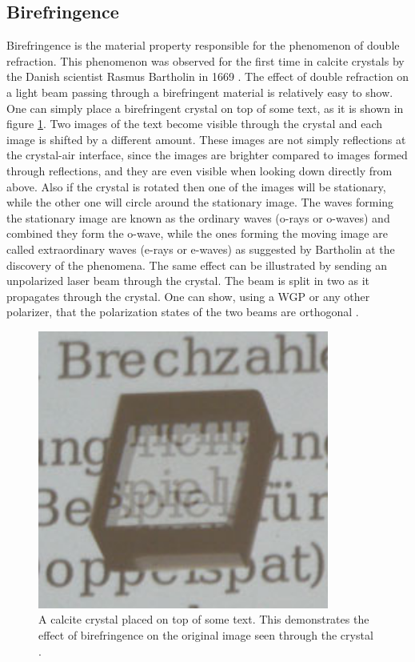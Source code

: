 \subsection{Birefringence}
\label{sec:birefringence}
Birefringence is the material property responsible for the phenomenon of double refraction. This phenomenon was observed for the first time in calcite crystals by the Danish scientist Rasmus Bartholin in 1669 \cite{RasmusBartholin1669, Restaino2015}. The effect of double refraction on a light beam passing through a birefringent material is relatively easy to show. One can simply place a birefringent crystal on top of some text, as it is shown in figure \ref{fig:3birefringence}. Two images of the text become visible through the crystal and each image is shifted by a different amount. These images are not simply reflections at the crystal-air interface, since the images are brighter compared to images formed through reflections, and they are even visible when looking down directly from above. Also if the crystal is rotated then one of the images will be stationary, while the other one will circle around the stationary image. The waves forming the stationary image are known as the ordinary waves (o-rays or o-waves) and combined they form the o-wave, while the ones forming the moving image are called extraordinary waves (e-rays or e-waves) as suggested by Bartholin at the discovery of the phenomena. The same effect can be illustrated by sending an unpolarized laser beam through the crystal. The beam is split in two as it propagates through the crystal. One can show, using a WGP or any other polarizer, that the polarization states of the two beams are orthogonal \cite{Roth2019}.

\begin{figure}[h]
    \centering
    \includegraphics[scale=0.25]{images/4_chapter04/birefringence.png}
    \caption{A calcite crystal placed on top of some text. This demonstrates the effect of birefringence on the original image seen through the crystal \cite{Roth2019}.}
    \label{fig:3birefringence}
\end{figure}

